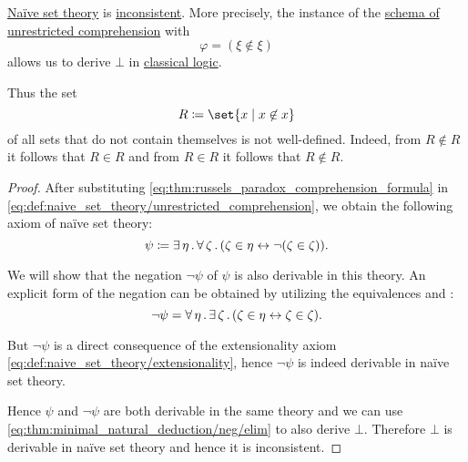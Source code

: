 \begin{theorem}\label{thm:russels_paradox}
  \hyperref[def:naive_set_theory]{Na\"ive set theory} is \hyperref[def:first_order_theory/consistent]{inconsistent}. More precisely, the instance of the \hyperref[def:naive_set_theory/unrestricted_comprehension]{schema of unrestricted comprehension} with
  \begin{equation}\label{eq:thm:russels_paradox_comprehension_formula}
    \varphi = (\xi \not\in \xi)
  \end{equation}
  allows us to derive \( \bot \) in \hyperref[def:classical_logic]{classical logic}.

  Thus the set
  \begin{equation}\label{eq:thm:russels_paradox_set}
    R \coloneqq \set{ x \given x \not\in x }
  \end{equation}
  of all sets that do not contain themselves is not well-defined. Indeed, from \( R \not\in R \) it follows that \( R \in R \) and from \( R \in R \) it follows that \( R \not\in R \).
\end{theorem}
\begin{proof}
  After substituting \eqref{eq:thm:russels_paradox_comprehension_formula} in \eqref{eq:def:naive_set_theory/unrestricted_comprehension}, we obtain the following axiom of na\"ive set theory:
  \begin{equation}\label{eq:thm:russels_paradox_comprehension_axiom}
    \psi \coloneqq \exists \thinspace \eta \thinspace . \thinspace \forall \thinspace \zeta \thinspace . \thinspace (\zeta \in \eta \leftrightarrow \neg (\zeta \in \zeta)).
  \end{equation}

  We will show that the negation \( \neg\psi \) of \( \psi \) is also derivable in this theory. An explicit form of the negation can be obtained by utilizing the equivalences  and :
  \begin{equation*}
    \neg\psi = \forall \thinspace \eta \thinspace . \thinspace \exists \thinspace \zeta \thinspace . \thinspace (\zeta \in \eta \leftrightarrow \zeta \in \zeta).
  \end{equation*}

  But \( \neg\psi \) is a direct consequence of the extensionality axiom \eqref{eq:def:naive_set_theory/extensionality}, hence \( \neg\psi \) is indeed derivable in na\"ive set theory.

  Hence \( \psi \) and \( \neg\psi \) are both derivable in the same theory and we can use \eqref{eq:thm:minimal_natural_deduction/neg/elim} to also derive \( \bot \). Therefore \( \bot \) is derivable in na\"ive set theory and hence it is inconsistent.
\end{proof}

